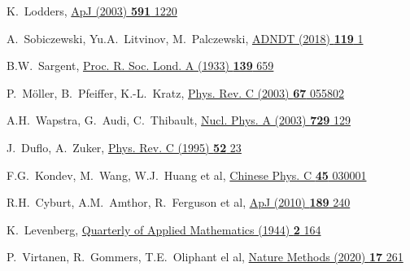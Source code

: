 \begin{thebibliography}{9}
K.~Lodders,
\href{https://doi.org/10.1086/375492}{ApJ (2003) \textbf{591} 1220}

A.~Sobiczewski, Yu.A.~Litvinov, M.~Palczewski, 
\href{https://doi.org/10.1016/j.adt.2017.05.001}{ADNDT (2018) \textbf{119} 1}

B.W.~Sargent,
\href{https://doi.org/10.1098/rspa.1933.0045}
  {Proc. R. Soc. Lond. A (1933) \textbf{139} 659}

P.~M\"oller, B.~Pfeiffer, K.-L.~Kratz,
\href{https://link.aps.org/doi/10.1103/PhysRevC.67.055802}
  {Phys. Rev. C (2003) \textbf{67} 055802}

A.H.~Wapstra, G.~Audi, C.~Thibault,
\href{https://doi.org/10.1016/j.nuclphysa.2003.11.002}
  {Nucl. Phys. A (2003) \textbf{729} 129}

J.~Duflo, A.~Zuker,
\href{https://doi.org/10.1103/PhysRevC.52.R23}
  {Phys. Rev. C (1995) \textbf{52} 23}

 F.G.~Kondev, M.~Wang, W.J.~Huang et al,
 \href{https://doi.org/10.1088/1674-1137/abddae}{Chinese Phys. C \textbf{45} 030001}

R.H.~Cyburt, A.M.~Amthor, R.~Ferguson et al,
\href{https://doi.org/10.1088/0067-0049/189/1/240}
  {ApJ (2010) \textbf{189} 240}

K.~Levenberg,
\href{https://doi.org/10.1090/qam/10666}
  {Quarterly of Applied Mathematics (1944) \textbf{2} 164}

P.~Virtanen, R.~Gommers, T.E.~Oliphant el al,
\href{https://doi.org/10.1038/s41592-019-0686-2}
  {Nature Methods (2020) \textbf{17} 261}
\end{thebibliography}
